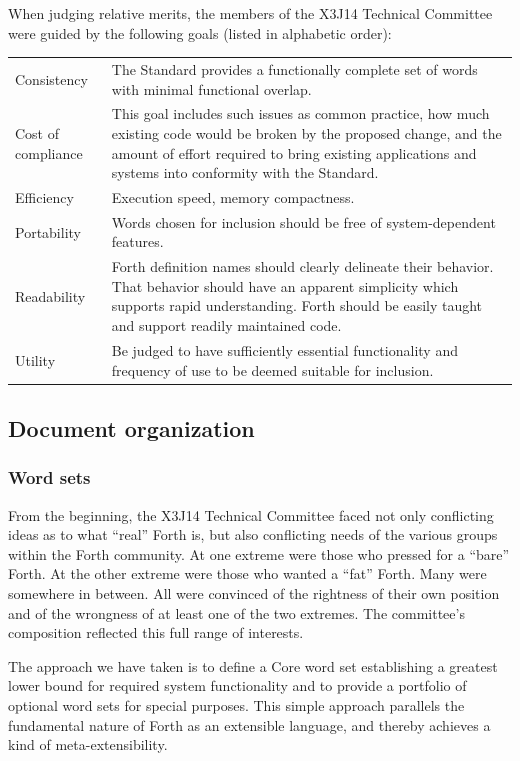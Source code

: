 When judging relative merits, the members of the X3J14 Technical
Committee were guided by the following goals (listed in alphabetic
order):

\begin{tabular}{lp{}}
Consistency	&
	The Standard provides a functionally complete set of words with
	minimal functional overlap.
	\\[\parskip]
Cost of compliance &
	This goal includes such issues as common practice, how much
	existing code would be broken by the proposed change, and the
	amount of effort required to bring existing applications and
	systems into conformity with the Standard.
	\\[\parskip]
Efficiency &
	Execution speed, memory compactness.
	\\[\parskip]
Portability	&
	Words chosen for inclusion should be free of system-dependent
	features.
	\\[\parskip]
Readability &
	Forth definition names should clearly delineate their behavior.
	That behavior should have an apparent simplicity which supports
	rapid understanding. Forth should be easily taught and support
	readily maintained code.
	\\[\parskip]
Utility	&
	Be judged to have sufficiently essential functionality and
	frequency of use to be deemed suitable for inclusion.
\end{tabular}


\subsection{Document organization} %

\subsubsection{Word sets} %

From the beginning, the X3J14 Technical Committee faced not only
conflicting ideas as to what ``real'' Forth is, but also conflicting
needs of the various groups within the Forth community. At one
extreme were those who pressed for a ``bare'' Forth. At the other
extreme were those who wanted a ``fat'' Forth. Many were somewhere
in between. All were convinced of the rightness of their own position
and of the wrongness of at least one of the two extremes. The
committee's composition reflected this full range of interests.

The approach we have taken is to define a Core word set establishing
a greatest lower bound for required system functionality and to
provide a portfolio of optional word sets for special purposes. This
simple approach parallels the fundamental nature of Forth as an
extensible language, and thereby achieves a kind of
meta-extensibility.

